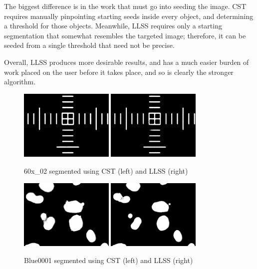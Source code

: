 \documentclass{article}
\begin{document}
The biggest difference is in the work that must go into seeding the image. CST requires manually pinpointing starting seeds inside every object, and determining a threshold for those objects. Meanwhile, LLSS requires only a starting segmentation that somewhat resembles the targeted image; therefore, it can be seeded from a single threshold that need not be precise.

Overall, LLSS produces more desirable results, and has a much easier burden of work placed on the user before it takes place, and so is clearly the stronger algorithm.

\begin{figure}
\centering
\includegraphics[width=0.4\textwidth]{figures/60x_02_sct.png}
\includegraphics[width=0.4\textwidth]{figures/60x_02_slls.png}
\caption{60x\_02 segmented using CST (left) and LLSS (right)}
\label{fig:b21_image1}
\end{figure}

\begin{figure}
\centering
\includegraphics[width=0.4\textwidth]{figures/Blue0001_sct.png}
\includegraphics[width=0.4\textwidth]{figures/Blue0001_slls.png}
\caption{Blue0001 segmented using CST (left) and LLSS (right)}
\label{fig:b21_image2}
\end{figure}
\end{document}
